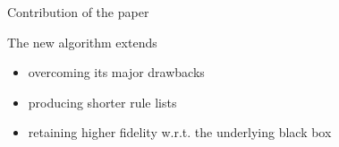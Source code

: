 \documentclass[presentation]{beamer}
\begin{document}
%
%

\begin{frame}{Contribution of the paper}

\begin{block}{The new \gridex algorithm extends \iter}
    \begin{itemize}
    	\item overcoming its major drawbacks
        \item producing shorter rule lists
        \item retaining higher fidelity w.r.t. the underlying black box
    \end{itemize}
\end{block}

\end{frame}
\end{document}
